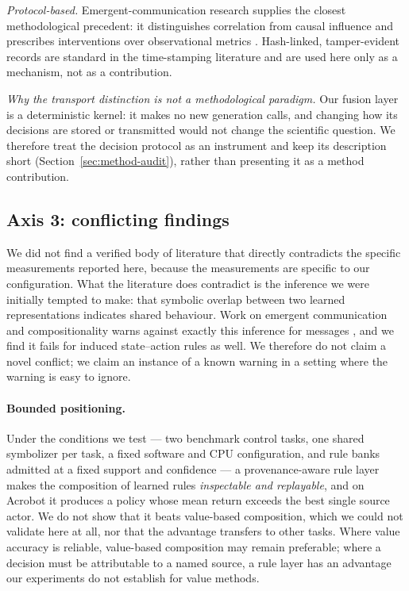 \documentclass[11pt,a4paper]{article}
\begin{document}
\emph{Protocol-based.} Emergent-communication research supplies the closest methodological precedent: it distinguishes correlation from causal influence and prescribes interventions over observational metrics \citep{lowe2019,kharitonov2019}. Hash-linked, tamper-evident records are standard in the time-stamping literature \citep{haber1991} and are used here only as a mechanism, not as a contribution.

\emph{Why the transport distinction is not a methodological paradigm.} Our fusion layer is a deterministic kernel: it makes no new generation calls, and changing how its decisions are stored or transmitted would not change the scientific question. We therefore treat the decision protocol as an instrument and keep its description short (Section~\ref{sec:method-audit}), rather than presenting it as a method contribution.

\subsection{Axis 3: conflicting findings}

We did not find a verified body of literature that directly contradicts the specific measurements reported here, because the measurements are specific to our configuration. What the literature does contradict is the inference we were initially tempted to make: that symbolic overlap between two learned representations indicates shared behaviour. Work on emergent communication and compositionality warns against exactly this inference for messages \citep{lowe2019,chaabouni2020}, and we find it fails for induced state--action rules as well. We therefore do not claim a novel conflict; we claim an instance of a known warning in a setting where the warning is easy to ignore.

\paragraph{Bounded positioning.} Under the conditions we test --- two benchmark control tasks, one shared symbolizer per task, a fixed software and CPU configuration, and rule banks admitted at a fixed support and confidence --- a provenance-aware rule layer makes the composition of learned rules \emph{inspectable and replayable}, and on Acrobot it produces a policy whose mean return exceeds the best single source actor. We do not show that it beats value-based composition, which we could not validate here at all, nor that the advantage transfers to other tasks. Where value accuracy is reliable, value-based composition may remain preferable; where a decision must be attributable to a named source, a rule layer has an advantage our experiments do not establish for value methods.
\end{document}
